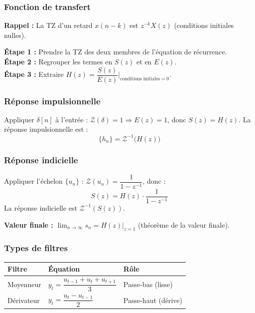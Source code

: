 \documentclass[12pt,a4paper]{article}
\newcommand{\TZ}{\mathcal{Z}}
\newcommand{\step}[1]{\textcolor{coursbleu}{\textbf{Étape #1 :}}}
\begin{document}
\subsubsection{Fonction de transfert}

\begin{tcolorbox}[formbox, title=Démarche -- Calcul de $H(z)$]
\textbf{Rappel :} La TZ d'un retard $x(n-k)$ est $z^{-k}X(z)$ (conditions initiales nulles).

\medskip
\step{1} Prendre la TZ des deux membres de l'équation de récurrence.\\
\step{2} Regrouper les termes en $S(z)$ et en $E(z)$.\\
\step{3} Extraire $H(z) = \dfrac{S(z)}{E(z)}\Big|_{\text{conditions initiales} = 0}$.
\end{tcolorbox}

\subsubsection{Réponse impulsionnelle}

Appliquer $\delta[n]$ à l'entrée : $\TZ(\delta) = 1 \Rightarrow E(z) = 1$, donc $S(z) = H(z)$.
La réponse impulsionnelle est :
\[
  \{h_n\} = \TZ^{-1}\bigl(H(z)\bigr)
\]

\subsubsection{Réponse indicielle}

Appliquer l'échelon $\{u_n\}$ : $\TZ(u_n) = \dfrac{1}{1-z^{-1}}$, donc :
\[
  S(z) = H(z)\cdot\frac{1}{1-z^{-1}}
\]
La réponse indicielle est $\TZ^{-1}(S(z))$.

\textbf{Valeur finale :} $\lim_{n\to\infty} s_n = H(z)\big|_{z=1}$ (théorème de la valeur finale).

\subsubsection{Types de filtres}

\begin{center}
\renewcommand{\arraystretch}{1.3}
\begin{tabular}{@{}lll@{}}
\toprule
\textbf{Filtre} & \textbf{Équation} & \textbf{Rôle} \\
\midrule
Moyenneur & $y_t = \dfrac{u_{t-1}+u_t+u_{t+1}}{3}$ & Passe-bas (lisse) \\[0.5em]
Dérivateur & $y_t = \dfrac{u_t - u_{t-1}}{2}$ & Passe-haut (dérive) \\
\bottomrule
\end{tabular}
\end{center}
\end{document}
